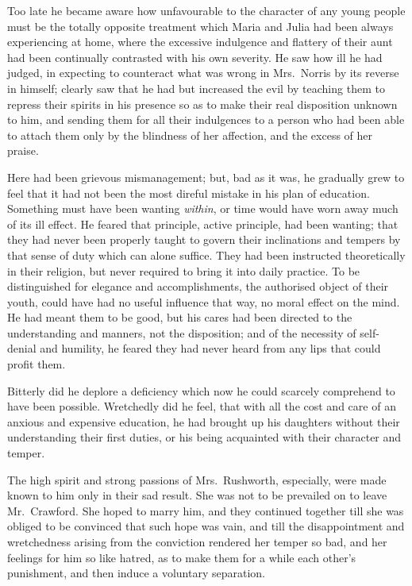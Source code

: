 Too late he became aware how unfavourable to the character
of any young people must be the totally opposite treatment
which Maria and Julia had been always experiencing at home,
where the excessive indulgence and flattery of their aunt
had been continually contrasted with his own severity.
He saw how ill he had judged, in expecting to counteract
what was wrong in Mrs.\ Norris by its reverse in himself;
clearly saw that he had but increased the evil by teaching
them to repress their spirits in his presence so as to make
their real disposition unknown to him, and sending them
for all their indulgences to a person who had been able
to attach them only by the blindness of her affection,
and the excess of her praise.

Here had been grievous mismanagement; but, bad as it was,
he gradually grew to feel that it had not been the most
direful mistake in his plan of education.  Something must
have been wanting \emph{within}, or time would have worn
away much of its ill effect.  He feared that principle,
active principle, had been wanting; that they had never
been properly taught to govern their inclinations and
tempers by that sense of duty which can alone suffice.
They had been instructed theoretically in their religion,
but never required to bring it into daily practice.
To be distinguished for elegance and accomplishments,
the authorised object of their youth, could have had no
useful influence that way, no moral effect on the mind.
He had meant them to be good, but his cares had been directed
to the understanding and manners, not the disposition;
and of the necessity of self-denial and humility,
he feared they had never heard from any lips that could
profit them.

Bitterly did he deplore a deficiency which now he
could scarcely comprehend to have been possible.
Wretchedly did he feel, that with all the cost and care
of an anxious and expensive education, he had brought up
his daughters without their understanding their first duties,
or his being acquainted with their character and temper.

The high spirit and strong passions of Mrs.\ Rushworth,
especially, were made known to him only in their sad result.
She was not to be prevailed on to leave Mr.\ Crawford.
She hoped to marry him, and they continued together
till she was obliged to be convinced that such hope
was vain, and till the disappointment and wretchedness
arising from the conviction rendered her temper so bad,
and her feelings for him so like hatred, as to make them
for a while each other's punishment, and then induce
a voluntary separation.

